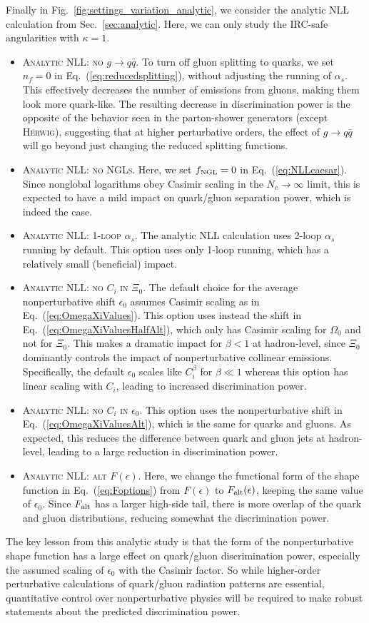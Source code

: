 \documentclass[11pt,letterpaper]{article}
\DeclareRobustCommand{\Sec}[1]{Sec.~\ref{#1}}
\DeclareRobustCommand{\Fig}[1]{Fig.~\ref{#1}}
\DeclareRobustCommand{\Eq}[1]{Eq.~(\ref{#1})}
\begin{document}
Finally in \Fig{fig:settings_variation_analytic}, we consider the analytic NLL calculation from \Sec{sec:analytic}.  Here, we can only study the IRC-safe angularities with $\kappa = 1$.  
\begin{itemize}
\item \textsc{Analytic NLL: no $g \to q\bar{q}$}.  To turn off gluon splitting to quarks, we set $n_f = 0$ in \Eq{eq:reducedsplitting}, without adjusting the running of $\alpha_s$.  This effectively decreases the number of emissions from gluons, making them look more quark-like.  The resulting decrease in discrimination power is the opposite of the behavior seen in the parton-shower generators (except \textsc{Herwig}), suggesting that at higher perturbative orders, the effect of $g \to q\bar{q}$ will go beyond just changing the reduced splitting functions.
\item \textsc{Analytic NLL: no NGLs}.  Here, we set $f_{\rm NGL} = 0$ in \Eq{eq:NLLcaesar}.  Since nonglobal logarithms obey Casimir scaling in the $N_c \to \infty$ limit, this is expected to have a mild impact on quark/gluon separation power, which is indeed the case. 
\item \textsc{Analytic NLL: 1-loop $\alpha_s$}.  The analytic NLL calculation uses 2-loop $\alpha_s$ running by default.  This option uses only 1-loop running, which has a relatively small (beneficial) impact.
\item \textsc{Analytic NLL: no $C_i$ in $\Xi_0$}.  The default choice for the average nonperturbative shift $\epsilon_0$ assumes Casimir scaling as in \Eq{eq:OmegaXiValues}.    This option uses instead the shift in \Eq{eq:OmegaXiValuesHalfAlt}, which only has Casimir scaling for $\Omega_0$ and not for $\Xi_0$.  This makes a dramatic impact for $\beta < 1$ at hadron-level, since $\Xi_0$ dominantly controls the impact of nonperturbative collinear emissions.  Specifically, the default $\epsilon_0$ scales like $C_i^\beta$ for $\beta \ll 1$ whereas this option has linear scaling with $C_i$, leading to increased discrimination power.
\item \textsc{Analytic NLL: no $C_i$ in $\epsilon_0$}.  This option uses the nonperturbative shift in \Eq{eq:OmegaXiValuesAlt}, which is the same for quarks and gluons.  As expected, this reduces the difference between quark and gluon jets at hadron-level, leading to a large reduction in discrimination power.
\item \textsc{Analytic NLL: alt $F(\epsilon)$}.  Here, we change the functional form of the shape function in \Eq{eq:Foptions} from $F(\epsilon)$ to $F_{\rm alt}(\epsilon)$, keeping the same value of $\epsilon_0$.  Since $F_{\rm alt}$ has a larger high-side tail, there is more overlap of the quark and gluon distributions, reducing somewhat the discrimination power.
\end{itemize}
The key lesson from this analytic study is that the form of the nonperturbative shape function has a large effect on quark/gluon discrimination power, especially the assumed scaling of $\epsilon_0$ with the Casimir factor.  So while higher-order perturbative calculations of quark/gluon radiation patterns are essential, quantitative control over nonperturbative physics will be required to make robust statements about the predicted discrimination power.
\end{document}
